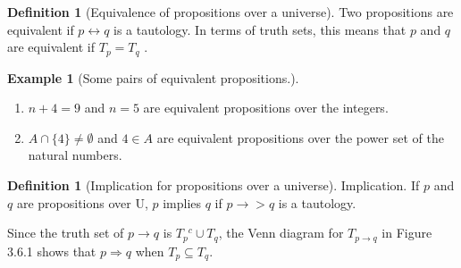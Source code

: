\documentclass[10pt,]{book}
\theoremstyle{plain}
\theoremstyle{definition}
\newtheorem{definition}[theorem]{Definition}
\theoremstyle{definition}
\theoremstyle{definition}
\newtheorem{example}[theorem]{Example}
\theoremstyle{definition}
\begin{document}
\begin{definition}[Equivalence of propositions over a universe]\label{def-equivanlence-over-U}
Two propositions are equivalent if \(p \leftrightarrow  q\) is a tautology. In terms of truth sets, this means that \(p\) and \(q\) are equivalent if \(T_p=T_q\) .
%
\end{definition}
\begin{example}[Some pairs of equivalent propositions.]\label{ex-some-equivalent-pairs}
\leavevmode%
\begin{enumerate}[label=\alph*]
\item\hypertarget{li-235}{}  \(n + 4 = 9\) and \(n = 5\) are equivalent propositions over the integers.%
\item\hypertarget{li-236}{} \(A \cap  \{4\} \neq  \emptyset\) and \(4 \in  A\) are equivalent propositions over the power set of the natural numbers.%
\end{enumerate}

%
\end{example}
\begin{definition}[Implication for propositions over a universe]\label{def-implication-over-U}
 Implication. If \(p\) and \(q\) are propositions over U, \(p\) implies \(q\) if \(p \rightarrow >q\) is a tautology.%
\end{definition}
\par
Since the truth set of \(p \rightarrow  q\) is \(T_p{}^c\cup T_q\), the Venn diagram for \(T_{p\to q}\) in Figure 3.6.1 shows that \(p \Rightarrow  q\) when \(T_p\subseteq T_q\).%
\leavevmode%
\end{document}

